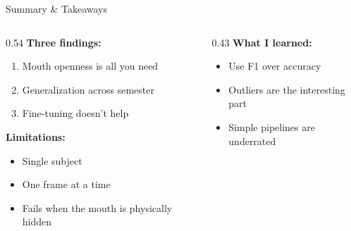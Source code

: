 \documentclass[aspectratio=169]{beamer}
\newcommand{\head}[1]{\textbf{#1}}
\begin{document}
\begin{frame}{Summary \& Takeaways}

  \begin{columns}[T]
    \begin{column}{0.54\textwidth}
      \head{Three findings:}
      \begin{enumerate}\footnotesize
        \item Mouth openness is all you need
        \item Generalization across semester
        \item Fine-tuning doesn't help
      \end{enumerate}

      \vspace{0.15em}
      \head{Limitations:}
      \begin{itemize}\footnotesize
        \item Single subject %
        \item One frame at a time %
        \item Fails when the mouth is physically hidden
      \end{itemize}
    \end{column}

    \begin{column}{0.43\textwidth}
      \head{What I learned:}
      \begin{itemize}\footnotesize
        \item Use F1 over accuracy
        \item Outliers are the interesting part
        \item Simple pipelines are underrated
      \end{itemize}


\end{column}
\end{columns}
\end{frame}
\end{document}
